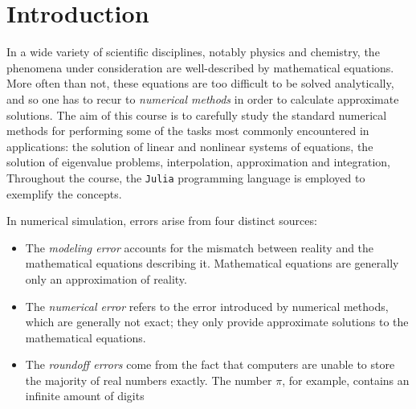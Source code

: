 \chapter*{Introduction}%
In a wide variety of scientific disciplines,
notably physics and chemistry,
the phenomena under consideration are well-described by mathematical equations.
More often than not,
these equations are too difficult to be solved analytically,
and so one has to recur to \emph{numerical methods} in order to calculate approximate solutions.
The aim of this course is to carefully study the standard numerical methods for performing some of the tasks most commonly encountered in applications:
the solution of linear and nonlinear systems of equations,
the solution of eigenvalue problems,
interpolation,
approximation and integration,
Throughout the course, the \texttt{Julia} programming language is employed to exemplify the concepts.

In numerical simulation,
errors arise from four distinct sources:
\begin{itemize}
    \item
        The \emph{modeling error} accounts for the mismatch between reality and the mathematical equations describing it.
        Mathematical equations are generally only an approximation of reality.
    \item
        The \emph{numerical error}
        refers to the error introduced by numerical methods,
        which are generally not exact;
        they only provide approximate solutions to the mathematical equations.
    \item 
        The \emph{roundoff errors} come from the fact that
        computers are unable to store the majority of real numbers exactly.
        The number $\pi$, for example,
        contains an infinite amount of digits
\end{itemize}

